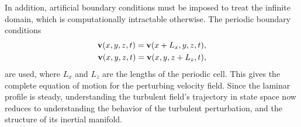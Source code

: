 In addition, artificial boundary conditions must be imposed to treat the infinite domain, which is computationally intractable otherwise. The periodic boundary conditions
\begin{align}
\mathbf{v}(x,y,z,t) = \mathbf{v}(x+L_x,y,z,t),\label{eq:periodicBCx}\\
\mathbf{v}(x,y,z,t) = \mathbf{v}(x,y,z+L_z,t),\label{eq:periodicBCz}
\end{align}
are used, where $L_x$ and $L_z$ are the lengths of the periodic cell. This gives the complete equation of motion for the perturbing velocity field.  Since the laminar profile is steady, understanding the turbulent field's trajectory in state space now reduces to understanding the behavior of the turbulent perturbation, and the structure of its inertial manifold. 
